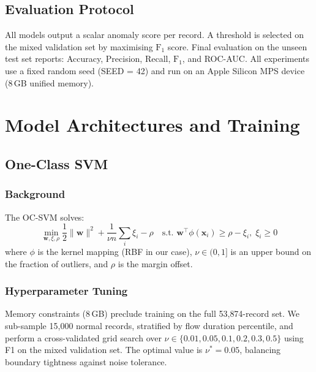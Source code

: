\documentclass[conference]{IEEEtran}
\begin{document}
\subsection{Evaluation Protocol}

All models output a scalar anomaly score per record. A threshold is selected
on the mixed validation set by maximising $\text{F}_{1}$ score. Final
evaluation on the unseen test set reports:
Accuracy, Precision, Recall, $\text{F}_{1}$, and ROC-AUC.
All experiments use a fixed random seed (SEED = 42) and run on an Apple
Silicon MPS device (8\,GB unified memory).

\section{Model Architectures and Training}
\label{sec:methods}

\subsection{One-Class SVM}

\subsubsection{Background}

The OC-SVM \cite{scholkopf2001estimating} solves:
\begin{equation}
  \min_{\mathbf{w},\xi,\rho}
    \frac{1}{2}\|\mathbf{w}\|^2 + \frac{1}{\nu n}\sum_i \xi_i - \rho
  \quad\text{s.t. } \mathbf{w}^\top\phi(\mathbf{x}_i) \geq \rho - \xi_i,\;\xi_i\geq 0
\end{equation}
where $\phi$ is the kernel mapping (RBF in our case), $\nu\in(0,1]$ is an
upper bound on the fraction of outliers, and $\rho$ is the margin offset.

\subsubsection{Hyperparameter Tuning}

Memory constraints (8\,GB) preclude training on the full 53{,}874-record set.
We sub-sample 15{,}000 normal records, stratified by flow duration percentile,
and perform a cross-validated grid search over
$\nu\in\{0.01,0.05,0.1,0.2,0.3,0.5\}$ using F1 on the mixed validation set.
The optimal value is $\nu^*=0.05$, balancing boundary tightness against noise
tolerance.
\end{document}
